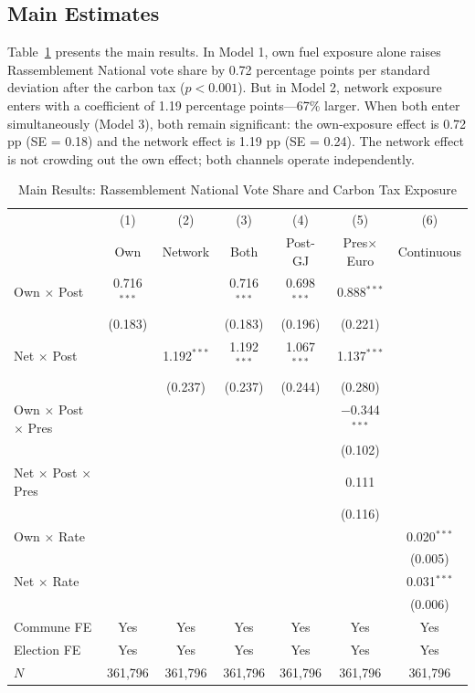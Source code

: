 \documentclass[12pt]{article}
\newcommand{\rn}{Rassemblement National}
\begin{document}
\subsection{Main Estimates}

Table~\ref{tab:main} presents the main results. In Model 1, own fuel exposure alone raises \rn{} vote share by 0.72 percentage points per standard deviation after the carbon tax ($p < 0.001$). But in Model 2, network exposure enters with a coefficient of 1.19 percentage points---67\% larger. When both enter simultaneously (Model 3), both remain significant: the own-exposure effect is 0.72 pp (SE = 0.18) and the network effect is 1.19 pp (SE = 0.24). The network effect is not crowding out the own effect; both channels operate independently.

\begin{table}[H]
\centering
\caption{Main Results: \rn{} Vote Share and Carbon Tax Exposure}
\label{tab:main}
\begin{threeparttable}
\begin{tabular}{@{}lcccccc@{}}
\toprule
 & (1) & (2) & (3) & (4) & (5) & (6) \\
 & Own & Network & Both & Post-GJ & Pres$\times$Euro & Continuous \\
\midrule
Own $\times$ Post & 0.716$^{***}$ & & 0.716$^{***}$ & 0.698$^{***}$ & 0.888$^{***}$ & \\
 & (0.183) & & (0.183) & (0.196) & (0.221) & \\[3pt]
Net $\times$ Post & & 1.192$^{***}$ & 1.192$^{***}$ & 1.067$^{***}$ & 1.137$^{***}$ & \\
 & & (0.237) & (0.237) & (0.244) & (0.280) & \\[3pt]
Own $\times$ Post $\times$ Pres & & & & & $-$0.344$^{***}$ & \\
 & & & & & (0.102) & \\[3pt]
Net $\times$ Post $\times$ Pres & & & & & 0.111 & \\
 & & & & & (0.116) & \\[3pt]
Own $\times$ Rate & & & & & & 0.020$^{***}$ \\
 & & & & & & (0.005) \\[3pt]
Net $\times$ Rate & & & & & & 0.031$^{***}$ \\
 & & & & & & (0.006) \\[3pt]
\midrule
Commune FE & Yes & Yes & Yes & Yes & Yes & Yes \\
Election FE & Yes & Yes & Yes & Yes & Yes & Yes \\
$N$ & 361,796 & 361,796 & 361,796 & 361,796 & 361,796 & 361,796 \\

\end{tabular}
\end{threeparttable}
\end{table}
\end{document}
